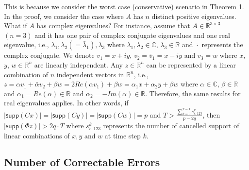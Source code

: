 \documentclass[../../thesis.tex]{subfiles}
\begin{document}
This is because we consider the worst case (conservative) scenario in Theorem 1. 
In the proof, we consider the case where $A$ has $n$ distinct positive eigenvalues. What if $A$ has complex eigenvalues? For instance, assume that $A \in \mathbb{R}^{3\times 3}$ $(n=3)$ and it has one pair of complex conjugate eigenvalues and one real eigenvalue, i.e., $\lambda_1, \lambda_2 (= \bar \lambda_1), \lambda_3$ where $\lambda_1, \lambda_2 \in \mathbb{C}$, $\lambda_3 \in \mathbb{R}$ and $\bar \cdot$ represents the complex conjugate. We denote $v_1 = x+ i y$, $v_2 = \bar v_1 = x - i y$ and $v_3 = w$ where $x$, $y$, $w  \in \mathbb{R}^n $ are linearly independent. Any $z \in \mathbb{R}^n$ can be represented by a linear combination of $n$ independent vectors in $\mathbb{R}^n$, i.e., $z = \alpha v_1 + \bar \alpha  v_2 + \beta w  = 2 Re( \alpha v_1) + \beta w =  \alpha_1 x + \alpha _2 y + \beta w$ where $\alpha \in \mathbb{C}$, $\beta \in \mathbb{R}$ and $\alpha_1 = Re(\alpha)\in \mathbb{R}$ and $\alpha_2 = - Im(\alpha) \in \mathbb{R}$. Therefore, the same results for real eigenvalues applies. In other words, if $ \lvert \textsf{supp}( C x) \rvert = \lvert \textsf{supp}( C y) \rvert = \lvert \textsf{supp}( C w) \rvert = p$ and $T > \frac { \sum_{k=0}^{T-1} s_{r,123}^k} {p - 2q}$, then $\lvert \textsf{supp} (\Phi z) \rvert > 2 q \cdot T$ where $s_{r,123}^k $ represents the number of cancelled support of linear combinations of $x,y$ and $w$ at time step $k$.


\subsection{Number of Correctable Errors}\label{sec:max_q}
\end{document}
